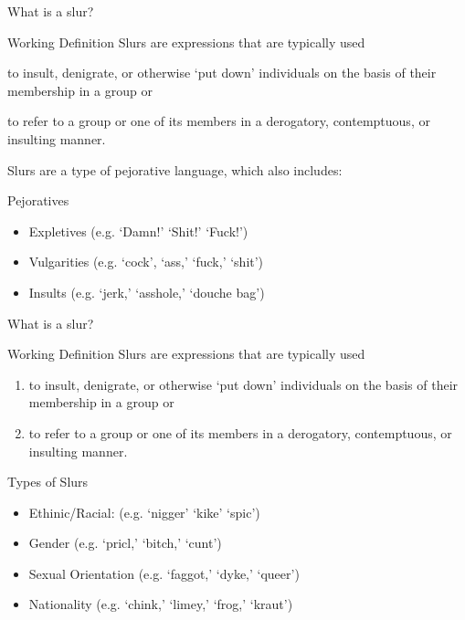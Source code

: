 \documentclass[xcolor=dvipsnames,12pt,handout]{beamer}
\begin{document}
\begin{frame}{What is a slur?}

\vspace{-.5cm}
\begin{block}{Working Definition}
{\small Slurs are expressions that are typically used}
\pause
	\begin{enumerate}
	{\small \item to insult, denigrate, or otherwise `put down' individuals on the basis of their membership in a group or 
	\pause
	\item to refer to a group or one of its members in a derogatory, contemptuous, or insulting manner.}
	\end{enumerate}
\end{block}

\pause
Slurs are a type of pejorative language, which also includes:
\pause
\begin{block}{Pejoratives}
\begin{itemize}
\item Expletives (e.g. `Damn!' `Shit!' `Fuck!')
\pause
\item Vulgarities (e.g. `cock', `ass,' `fuck,' `shit')
\pause
\item Insults (e.g. `jerk,' `asshole,' `douche bag')
\end{itemize}
\end{block}

\end{frame}

\begin{frame}{What is a slur?}

\begin{block}{Working Definition}
Slurs are expressions that are typically used
	\begin{enumerate}
	\item to insult, denigrate, or otherwise `put down' individuals \alert<2->{on the basis of their membership in a group} or 
	\item to refer to \alert<2->{a group or one of its members} in a derogatory, contemptuous, or insulting manner.
	\end{enumerate}
\end{block}
\pause
\pause
\begin{block}{Types of Slurs}
\begin{itemize}
\item Ethinic/Racial: (e.g. `nigger' `kike' `spic')
\pause
\item Gender (e.g. `pricl,' `bitch,' `cunt')
\pause
\item Sexual Orientation (e.g. `faggot,' `dyke,' `queer')
\pause
\item Nationality (e.g. `chink,' `limey,' `frog,' `kraut')
\end{itemize}
\end{block}

\end{frame}
\end{document}
